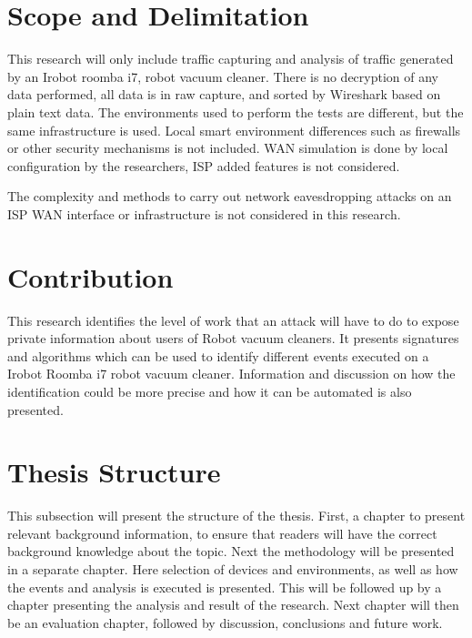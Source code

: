 \section{Scope and Delimitation}
This research will only include traffic capturing and analysis of traffic generated by an Irobot roomba i7, robot vacuum cleaner. There is no decryption of any data performed, all data is in raw capture, and sorted by Wireshark based on plain text data. The environments used to perform the tests are different, but the same infrastructure is used. Local smart environment differences such as firewalls or other security mechanisms is not included. WAN simulation is done by local configuration by the researchers, ISP added features is not considered. 

The complexity and methods to carry out network eavesdropping attacks on an ISP WAN interface or infrastructure is not considered in this research.
\section{Contribution}
This research identifies the level of work that an attack will have to do to expose private information about users of Robot vacuum cleaners. It presents signatures and algorithms which can be used to identify different events executed on a Irobot Roomba i7 robot vacuum cleaner. Information and discussion on how the identification could be more precise and how it can be automated is also presented. 

\section{Thesis Structure}
This subsection will present the structure of the thesis. First, a chapter to present relevant background information, to ensure that readers will have the correct background knowledge about the topic. Next the methodology will be presented in a separate chapter. Here selection of devices and environments, as well as how the events and analysis is executed is presented. This will be followed up by a chapter presenting the analysis and result of the research. Next chapter will then be an evaluation chapter, followed by discussion, conclusions and future work.  


